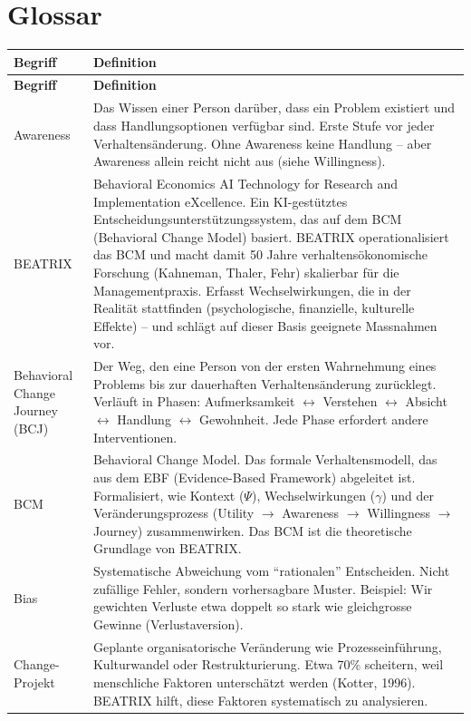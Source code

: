 \documentclass[11pt,a4paper]{article}
\begin{document}
\section*{Glossar}

\begin{longtable}{@{}L{4cm}L{10cm}@{}}
\toprule
\textbf{Begriff} & \textbf{Definition} \\
\midrule
\endfirsthead
\toprule
\textbf{Begriff} & \textbf{Definition} \\
\midrule
\endhead

Awareness & Das Wissen einer Person darüber, dass ein Problem existiert und dass Handlungsoptionen verfügbar sind. Erste Stufe vor jeder Verhaltensänderung. Ohne Awareness keine Handlung -- aber Awareness allein reicht nicht aus (siehe Willingness). \\
\midrule
BEATRIX & Behavioral Economics AI Technology for Research and Implementation eXcellence. Ein KI-gestütztes Entscheidungsunterstützungssystem, das auf dem BCM (Behavioral Change Model) basiert. BEATRIX operationalisiert das BCM und macht damit 50 Jahre verhaltensökonomische Forschung (Kahneman, Thaler, Fehr) skalierbar für die Managementpraxis. Erfasst Wechselwirkungen, die in der Realität stattfinden (psychologische, finanzielle, kulturelle Effekte) -- und schlägt auf dieser Basis geeignete Massnahmen vor. \\
\midrule
Behavioral Change Journey (BCJ) & Der Weg, den eine Person von der ersten Wahrnehmung eines Problems bis zur dauerhaften Verhaltensänderung zurücklegt. Verläuft in Phasen: Aufmerksamkeit $\leftrightarrow$ Verstehen $\leftrightarrow$ Absicht $\leftrightarrow$ Handlung $\leftrightarrow$ Gewohnheit. Jede Phase erfordert andere Interventionen. \\
\midrule
BCM & Behavioral Change Model. Das formale Verhaltensmodell, das aus dem EBF (Evidence-Based Framework) abgeleitet ist. Formalisiert, wie Kontext ($\Psi$), Wechselwirkungen ($\gamma$) und der Veränderungsprozess (Utility $\rightarrow$ Awareness $\rightarrow$ Willingness $\rightarrow$ Journey) zusammenwirken. Das BCM ist die theoretische Grundlage von BEATRIX. \\
\midrule
Bias & Systematische Abweichung vom ``rationalen'' Entscheiden. Nicht zufällige Fehler, sondern vorhersagbare Muster. Beispiel: Wir gewichten Verluste etwa doppelt so stark wie gleichgrosse Gewinne (Verlustaversion). \\
\midrule
Change-Projekt & Geplante organisatorische Veränderung wie Prozesseinführung, Kulturwandel oder Restrukturierung. Etwa 70\% scheitern, weil menschliche Faktoren unterschätzt werden (Kotter, 1996). BEATRIX hilft, diese Faktoren systematisch zu analysieren. \\

\end{longtable}
\end{document}
